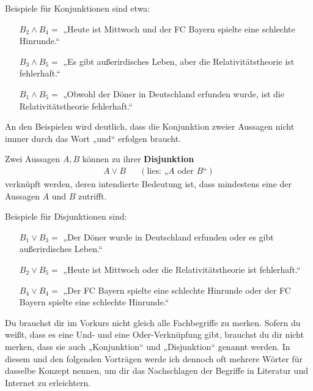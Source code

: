 \begin{bsp}
    Beispiele für Konjunktionen sind etwa:
    \begin{itemize}[labelindent=1.5em, leftmargin=!, labelwidth=]
        \item[$B_2\land B_4 =$] „Heute ist Mittwoch und der FC Bayern spielte eine schlechte Hinrunde.“
        \item[$B_3\land B_5 =$] „Es gibt außerirdisches Leben, aber die Relativitätstheorie ist fehlerhaft.“
        \item[$B_1\land B_5 =$] „Obwohl der Döner in Deutschland erfunden wurde, ist die Relativitätstheorie fehlerhaft.“
    \end{itemize}
    An den Beispielen wird deutlich, dass die Konjunktion zweier Aussagen nicht immer durch das Wort „und“ erfolgen braucht.
\end{bsp}
	
	
\begin{defin} 
    Zwei Aussagen $A,B$ können zu ihrer \textbf{Disjunktion}
    \begin{align*}
        A\lor B && (\text{lies: „$A$ oder $B$“})
    \end{align*}
    verknüpft werden, deren intendierte Bedeutung ist, dass mindestens eine der Aussagen $A$ und $B$ zutrifft.
\end{defin}
    

\begin{bsp}
    Beispiele für Disjunktionen sind:
    \begin{itemize}[labelindent=1.5em, leftmargin=!, labelwidth=]
        \item[$B_1 \lor B_3 =$] „Der Döner wurde in Deutschland erfunden oder es gibt außerirdisches Leben.“
        \item[$B_2\lor B_5 =$] „Heute ist Mittwoch oder die Relativitätstheorie ist fehlerhaft.“
        \item[$B_4\lor B_4=$] „Der FC Bayern spielte eine schlechte Hinrunde oder der FC Bayern spielte eine schlechte Hinrunde.“
    \end{itemize}
\end{bsp}

		
\begin{bem}[Fachbegriffe]
    Du brauchst dir im Vorkurs nicht gleich alle Fachbegriffe zu merken. Sofern du weißt, dass es eine Und- und eine Oder-Verknüpfung gibt, brauchst du dir nicht merken, dass sie auch „Konjunktion“ und „Disjunktion“ genannt werden. In diesem und den folgenden Vorträgen werde ich dennoch oft mehrere Wörter für dasselbe Konzept nennen, um dir das Nachschlagen der Begriffe in Literatur und Internet zu erleichtern.
\end{bem}

